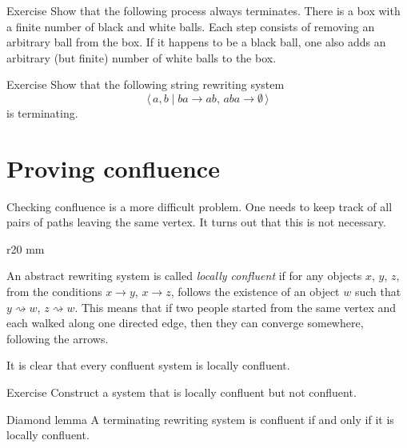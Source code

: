 \begin{thm}{Exercise}\label{ex:balls}
Show that the following process always terminates.
There is a box with a finite number of black and white balls.
Each step consists of removing an arbitrary ball from the box.
If it happens to be a black ball, one also adds an arbitrary (but finite) number of white balls to the box.
\end{thm}

\begin{thm}{Exercise}\label{ex:ab>ba,aba>}
Show that the following string rewriting system 
\[\langle\, a,b \mid ba\to ab,\, aba\to\emptyset\,\rangle\]
is terminating.
\end{thm}


\section{Proving confluence}

Checking confluence is a more difficult problem.
One needs to keep track of all pairs of paths leaving the same vertex.
It turns out that this is not necessary.

\begin{wrapfigure}{r}{20 mm}
\vskip-0mm
\centering
{}
\vskip-0mm
\end{wrapfigure}

An abstract rewriting system is called \emph{locally confluent} if for any objects $x$, $y$, $z$, from the conditions $x \to y$, $x\to z$, follows the existence of an object $w$ such that $y\rightsquigarrow  w$, $z\rightsquigarrow  w$.
This means that if two people started from the same vertex and each walked along one directed edge, then they can converge somewhere, following the arrows.

It is clear that every confluent system is locally confluent.

\begin{thm}{Exercise}
Construct a system that is locally confluent but not confluent.
\end{thm}


\begin{thm}{Diamond lemma}\label{lem:diamond}
A terminating rewriting system is confluent if and only if it is locally confluent.
\end{thm}
 

